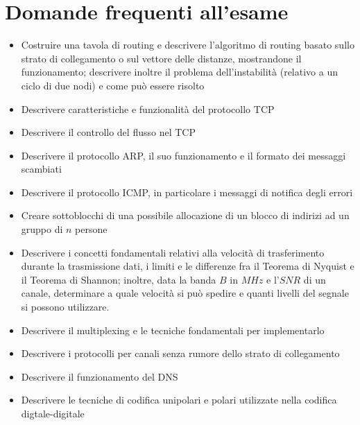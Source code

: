 \section{Domande frequenti all'esame}

\begin{itemize}
    \item
    Costruire una tavola di routing e descrivere l'algoritmo di routing basato sullo strato di collegamento o sul vettore delle distanze, mostrandone il funzionamento; descrivere inoltre il problema dell'instabilità (relativo a un ciclo di due nodi) e come può essere risolto
    
    \item
    Descrivere caratteristiche e funzionalità del protocollo TCP
    
    \item
    Descrivere il controllo del flusso nel TCP
    
    \item
    Descrivere il protocollo ARP, il suo funzionamento e il formato dei messaggi scambiati
    
    \item
    Descrivere il protocollo ICMP, in particolare i messaggi di notifica degli errori
    
    \item
    Creare sottoblocchi di una possibile allocazione di un blocco di indirizi ad un gruppo di $n$ persone
    
    \item
    Descrivere i concetti fondamentali relativi alla velocità di trasferimento durante la trasmissione dati, i limiti e le differenze fra il Teorema di Nyquist e il Teorema di Shannon; inoltre, data la banda $B$ in $MHz$ e l'$SNR$ di un canale, determinare a quale velocità si può spedire e quanti livelli del segnale si possono utilizzare. 
    
    \item
    Descrivere il multiplexing e le tecniche fondamentali per implementarlo
    
    \item
    Descrivere i protocolli per canali senza rumore dello strato di collegamento
    
    \item
    Descrivere il funzionamento del DNS
    
    \item
    Descrivere le tecniche di codifica unipolari e polari utilizzate nella codifica digtale-digitale
    

\end{itemize}
